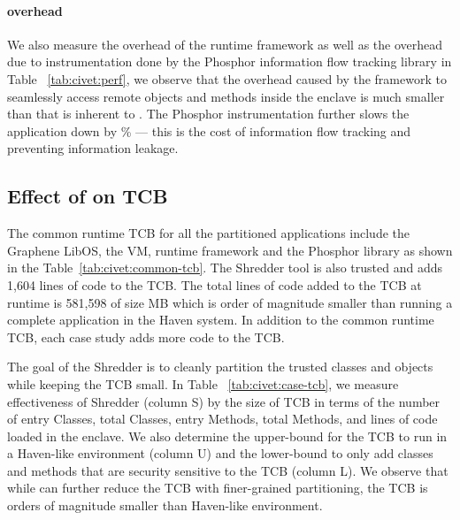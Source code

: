 \paragraph{\sysname{} overhead}
We also measure the overhead of the \sysname{} runtime framework as well as the 
overhead due to instrumentation done by the Phosphor information flow tracking library in Table ~\ref{tab:civet:perf}, we observe that the overhead caused by the \sysname{} framework to seamlessly access remote objects and methods inside the enclave is much smaller than that is inherent to \sgx{}. The Phosphor instrumentation further slows the application down by \% --- this is the cost of information flow tracking and preventing information leakage. 
\subsection{Effect of \sysname{} on TCB}

The common runtime TCB for all the partitioned applications include the Graphene LibOS, 
the \java{} VM, \sysname{} runtime framework and the Phosphor library as shown in the 
Table~\ref{tab:civet:common-tcb}. The \sysname{} Shredder tool is also trusted and 
adds 1,604 lines of code to the TCB. The total lines of code added to the TCB at runtime is 581,598 of size MB which is order of magnitude smaller than running a complete \java{} application in the Haven system.
In addition to the common runtime TCB, each case study adds more code to the TCB.


The goal of the \sysname{} Shredder is to cleanly partition the trusted classes and objects while keeping the TCB small. 
In Table ~\ref{tab:civet:case-tcb}, we measure effectiveness of Shredder (column S) by the size of TCB in terms of the number of entry Classes, total Classes, entry Methods, total Methods, and lines of code loaded in the enclave. 
We also determine the upper-bound for the TCB to run in a Haven-like environment (column U) and the lower-bound to only add classes and methods that are security sensitive to the TCB (column L). We observe that while \sysname{} can further reduce the TCB with finer-grained partitioning, the TCB is orders of magnitude smaller than Haven-like environment.

